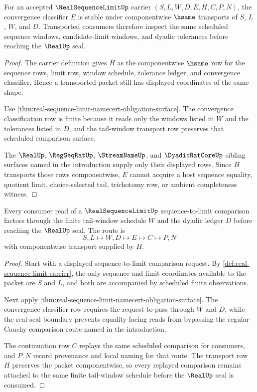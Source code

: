 \begin{theorem}\label{thm:realsequencelimit-limit-classifier-stability}
For an accepted $\RealSequenceLimitUp$ carrier $(S,L,W,D,E,H,C,P,N)$, the convergence classifier $E$ is stable under componentwise $\hsame$ transports of $S$, $L$, $W$, and $D$. Transported consumers therefore inspect the same scheduled sequence windows, candidate-limit windows, and dyadic tolerances before reaching the $\RealUp$ seal.
\end{theorem}
\begin{proof}
The carrier definition gives $H$ as the componentwise $\hsame$ row for the sequence rows, limit row, window schedule, tolerance ledger, and convergence classifier. Hence a transported packet still has displayed coordinates of the same shape.

Use \autoref{thm:real-sequence-limit-namecert-obligation-surface}. The convergence classification row is finite because it reads only the windows listed in $W$ and the tolerances listed in $D$, and the tail-window transport row preserves that scheduled comparison surface.

The $\RealUp$, $\RegSeqRatUp$, $\StreamNameUp$, and $\DyadicRatCoreUp$ sibling surfaces named in the introduction supply only their displayed rows. Since $H$ transports those rows componentwise, $E$ cannot acquire a host sequence equality, quotient limit, choice-selected tail, trichotomy row, or ambient completeness witness.
\end{proof}

\begin{theorem}\label{thm:realsequencelimit-tail-window-transport}
Every consumer read of a $\RealSequenceLimitUp$ sequence-to-limit comparison factors through the finite tail-window schedule $W$ and the dyadic ledger $D$ before reaching the $\RealUp$ seal. The route is
$$
S,L\longmapsto W,D\longmapsto E\longmapsto C\longmapsto P,N
$$
with componentwise transport supplied by $H$.
\end{theorem}
\begin{proof}
Start with a displayed sequence-to-limit comparison request. By \autoref{def:real-sequence-limit-carrier}, the only sequence and limit coordinates available to the packet are $S$ and $L$, and both are accompanied by scheduled finite observations.

Next apply \autoref{thm:real-sequence-limit-namecert-obligation-surface}. The convergence classifier row requires the request to pass through $W$ and $D$, while the real-seal boundary prevents equality-facing reads from bypassing the regular-Cauchy comparison route named in the introduction.

The continuation row $C$ replays the same scheduled comparison for consumers, and $P,N$ record provenance and local naming for that route. The transport row $H$ preserves the packet componentwise, so every replayed comparison remains attached to the same finite tail-window schedule before the $\RealUp$ seal is consumed.
\end{proof}

